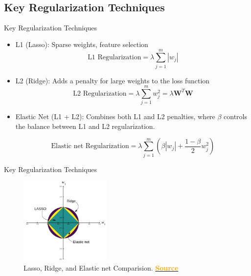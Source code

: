 \documentclass[serif, aspectratio=169]{beamer}
\begin{document}
\subsection{Key Regularization Techniques}
\begin{frame}{Key Regularization Techniques}
    \begin{itemize}[<+-| alert@+>] %

            \item L1 (Lasso): Sparse weights, feature selection
                \begin{equation}
                    \text{L1 Regularization} = \lambda \sum_{j=1}^{m} |w_j|
                \end{equation}

            \item L2 (Ridge): Adds a penalty for large weights to the loss function
                \begin{equation}
                    \text{L2 Regularization} = \lambda \sum_{j=1}^{m} w_j^2 =
                    \lambda \textbf{W}^T\textbf{W}
                \end{equation}

            \item Elastic Net (L1 + L2): Combines both L1 and L2 penalties, where $\beta$ controls the balance between L1 and L2 regularization.

                \begin{equation}
                    \text{Elastic net Regularization} =\lambda \sum_{j=1}^{m} (\beta|w_j| + \frac{1-\beta}{2} w_j^2)
                \end{equation}
            
    \end{itemize}
\end{frame}

\begin{frame}{Key Regularization Techniques}

            \begin{figure}
                \includegraphics[width=0.4\textwidth]{pic/Regularization.png}
                 \caption{Lasso, Ridge, and Elastic net Comparision. \href{https://analyticsindiamag.com/ai-mysteries/hands-on-tutorial-on-elasticnet-regression/}{\textcolor{orange}{\textbf{Source}}}}
                \label{fig:Regularization}
            \end{figure}

\end{frame}
\end{document}
